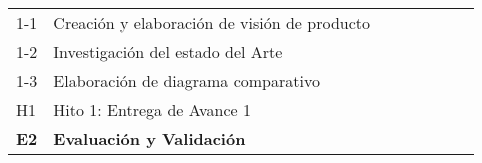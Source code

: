 \begin{table}[H]
\begin{tabular}{llllllll}
1-1         & Creación y elaboración de visión de producto &            &            &           &           &           &           \\
1-2         & Investigación del estado del Arte            &            &            &           &           &           &           \\
1-3         & Elaboración de diagrama comparativo          &            &            &           &           &           &           \\
\rowcolor[HTML]{ECF4FF} 
H1          & Hito 1: Entrega de Avance 1                  &            &            &           &           &           &           \\
\rowcolor[HTML]{DAE8FC} 
\textbf{E2} & \textbf{Evaluación y Validación}             & \textbf{}  & \textbf{}  & \textbf{} & \textbf{} & \textbf{} & \textbf{}
\end{tabular}
\end{table}
